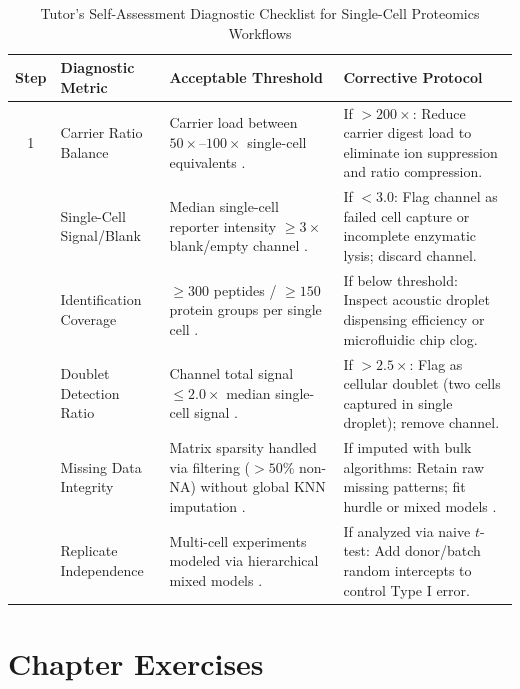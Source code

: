 \documentclass[11pt,twoside,openright]{book}
\begin{document}
\begin{table}[ht]
\centering
\caption{Tutor's Self-Assessment Diagnostic Checklist for Single-Cell Proteomics Workflows}
\label{tab:scp_checklist}
\small
\begin{tabularx}{\textwidth}{c p{3.8cm} p{4.2cm} X}
\toprule
\textbf{Step} & \textbf{Diagnostic Metric} & \textbf{Acceptable Threshold} & \textbf{Corrective Protocol} \\
\midrule
1 & Carrier Ratio Balance & Carrier load between $50\times$--$100\times$ single-cell equivalents \cite{slavov2021scope2}. & If $>200\times$: Reduce carrier digest load to eliminate ion suppression and ratio compression. \\
\addlinespace
2 & Single-Cell Signal/Blank & Median single-cell reporter intensity $\ge 3\times$ blank/empty channel \cite{vanderaa2021scp}. & If $<3.0$: Flag channel as failed cell capture or incomplete enzymatic lysis; discard channel. \\
\addlinespace
3 & Identification Coverage & $\ge 300$ peptides / $\ge 150$ protein groups per single cell \cite{schoof2021single}. & If below threshold: Inspect acoustic droplet dispensing efficiency or microfluidic chip clog. \\
\addlinespace
4 & Doublet Detection Ratio & Channel total signal $\le 2.0\times$ median single-cell signal \cite{woo2022high}. & If $>2.5\times$: Flag as cellular doublet (two cells captured in single droplet); remove channel. \\
\addlinespace
5 & Missing Data Integrity & Matrix sparsity handled via filtering ($>50\%$ non-NA) without global KNN imputation \cite{brunner2022ultra}. & If imputed with bulk algorithms: Retain raw missing patterns; fit hurdle or mixed models \cite{choi2014msstats}. \\
\addlinespace
6 & Replicate Independence & Multi-cell experiments modeled via hierarchical mixed models \cite{squair2021confronting, zimmerman2021practical}. & If analyzed via naive $t$-test: Add donor/batch random intercepts to control Type I error. \\
\bottomrule
\end{tabularx}
\end{table}

\FloatBarrier

\section{Chapter Exercises}
\end{document}
